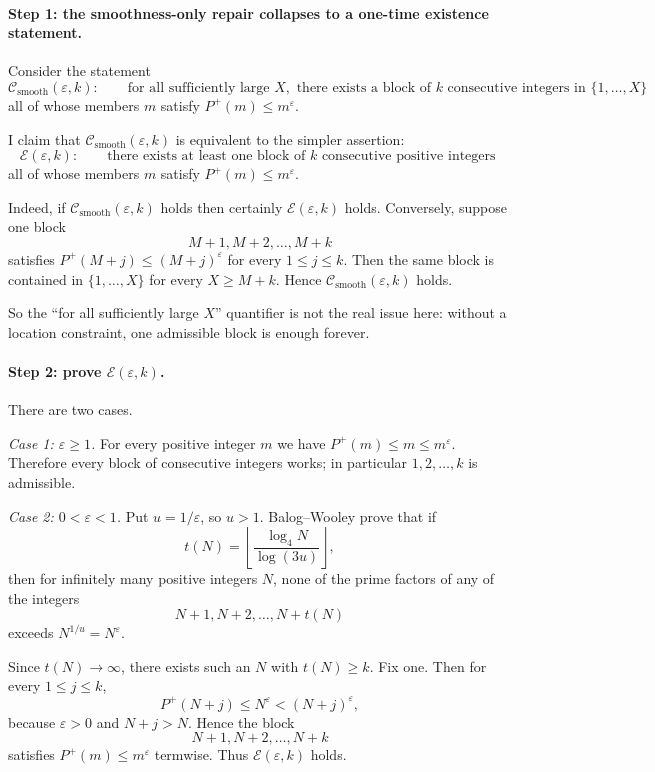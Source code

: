 \paragraph{Step 1: the smoothness-only repair collapses to a one-time existence statement.}
Consider the statement
\[
\mathcal C_{\mathrm{smooth}}(\varepsilon,k):\qquad
\text{for all sufficiently large } X, \text{ there exists a block of } k
\text{ consecutive integers in } \{1,\ldots,X\}
\]
all of whose members $m$ satisfy $P^{+}(m)\leq m^{\varepsilon}$.

I claim that $\mathcal C_{\mathrm{smooth}}(\varepsilon,k)$ is equivalent to the simpler assertion:
\[
\mathcal E(\varepsilon,k):\qquad
\text{there exists at least one block of } k \text{ consecutive positive integers }
\]
all of whose members $m$ satisfy $P^{+}(m)\leq m^{\varepsilon}$.

Indeed, if $\mathcal C_{\mathrm{smooth}}(\varepsilon,k)$ holds then certainly $\mathcal E(\varepsilon,k)$ holds. Conversely, suppose one block
\[
M+1,M+2,\ldots,M+k
\]
satisfies $P^{+}(M+j)\leq (M+j)^{\varepsilon}$ for every $1\leq j\leq k$. Then the same block is contained in $\{1,\ldots,X\}$ for every $X\geq M+k$. Hence $\mathcal C_{\mathrm{smooth}}(\varepsilon,k)$ holds.

So the ``for all sufficiently large $X$'' quantifier is not the real issue here: without a location constraint, one admissible block is enough forever.

\paragraph{Step 2: prove $\mathcal E(\varepsilon,k)$.}
There are two cases.

\smallskip
\noindent\emph{Case 1: $\varepsilon\geq 1$.}
For every positive integer $m$ we have $P^{+}(m)\leq m\leq m^{\varepsilon}$. Therefore every block of consecutive integers works; in particular $1,2,\ldots,k$ is admissible.

\smallskip
\noindent\emph{Case 2: $0<\varepsilon<1$.}
Put $u=1/\varepsilon$, so $u>1$. Balog--Wooley prove that if
\[
t(N)=\left\lfloor \frac{\log_{4} N}{\log(3u)}\right\rfloor,
\]
then for infinitely many positive integers $N$, none of the prime factors of any of the integers
\[
N+1,N+2,\ldots,N+t(N)
\]
exceeds $N^{1/u}=N^{\varepsilon}$.

Since $t(N)\to\infty$, there exists such an $N$ with $t(N)\geq k$. Fix one. Then for every $1\leq j\leq k$,
\[
P^{+}(N+j)\leq N^{\varepsilon}< (N+j)^{\varepsilon},
\]
because $\varepsilon>0$ and $N+j>N$. Hence the block
\[
N+1,N+2,\ldots,N+k
\]
satisfies $P^{+}(m)\leq m^{\varepsilon}$ termwise. Thus $\mathcal E(\varepsilon,k)$ holds.

